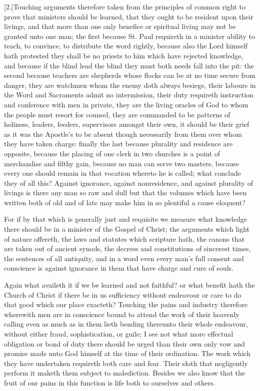 [2.]Touching arguments therefore taken from the principles of common right to prove that ministers should be learned, that they ought to be resident upon their livings, and that more than one only benefice or spiritual living may not be granted unto one man; the first because St. Paul requireth in a minister ability to teach, to convince, to distribute the word rightly, because also the Lord himself hath protested they shall be no priests to him which have rejected knowledge, and because if the blind lead the blind they must both needs fall into the pit: the second because teachers are shepherds whose flocks can be at no time secure from danger, they are watchmen whom the enemy doth always besiege, their labours in the Word and Sacraments admit no intermission,  their duty requireth instruction and conference with men in private,
 they are the living oracles of God to whom the people must resort for counsel, they are commanded to be patterns of holiness, leaders, feeders, supervisors amongst their own, it should be their grief as it was the Apostle’s to be absent though necessarily from them over whom they have taken charge: finally the last because plurality and residence are opposite, because the placing of one clerk in two churches is a point of merchandise and filthy gain, because no man can serve two masters, because every one should remain in that vocation whereto he is called; what conclude they of all this? Against ignorance, against nonresidence, and against plurality of livings is there any man so raw and dull but that the volumes which have been written both of old and of late may make him in so plentiful a cause eloquent?

For if by that which is generally just and requisite we measure what knowledge there should be in a minister of the Gospel of Christ; the arguments which light of nature offereth, the laws and statutes which scripture hath, the canons that are taken out of ancient synods, the decrees and constitutions of sincerest times, the sentences of all antiquity, and in a word even every man’s full consent and conscience is against ignorance in them that have charge and cure of souls.

Again what availeth it if we be learned and not faithful? or what benefit hath the Church of Christ if there be in us sufficiency without endeavour or care to do that good which our place exacteth? Touching the pains and industry therefore wherewith men are in conscience bound to attend the work of their heavenly calling even as much as in them lieth bending thereunto their whole endeavour, without either fraud, sophistication, or guile; I see not what more effectual obligation or bond of duty there should be urged than their own only vow and promise made unto God himself at the time of their  ordination. The work which they have undertaken requireth both care and fear. Their sloth that negligently perform it maketh them subject to malediction. Besides we also know that the fruit of our pains in this function is life both to ourselves and others.

